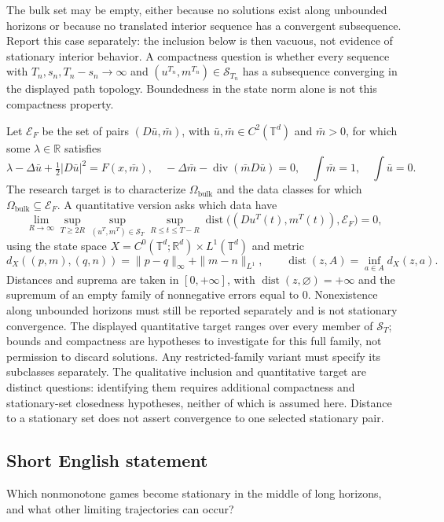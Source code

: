 \documentclass[11pt,a4paper]{article}
\begin{document}
The bulk set may be empty, either because no solutions exist along unbounded horizons or because no translated interior sequence has a convergent subsequence. Report this case separately: the inclusion below is then vacuous, not evidence of stationary interior behavior. A compactness question is whether every sequence with $T_n,s_n,T_n-s_n\to\infty$ and $(u^{T_n},m^{T_n})\in\mathcal S_{T_n}$ has a subsequence converging in the displayed path topology. Boundedness in the state norm alone is not this compactness property.

Let $\mathcal E_F$ be the set of pairs $(D\bar u,\bar m)$, with $\bar u,\bar m\in C^2(\mathbb T^d)$ and $\bar m>0$, for which some $\lambda\in\mathbb R$ satisfies
\[
 \lambda-\Delta\bar u+\tfrac12|D\bar u|^2=F(x,\bar m),\quad
 -\Delta\bar m-\operatorname{div}(\bar m D\bar u)=0,\quad
 \int\bar m=1,\quad \int\bar u=0.
\]
The research target is to characterize $\Omega_{\mathrm{bulk}}$ and the data classes for which $\Omega_{\mathrm{bulk}}\subseteq\mathcal E_F$. A quantitative version asks which data have
\[
 \lim_{R\to\infty}\sup_{T\geq2R}\sup_{(u^T,m^T)\in\mathcal S_T}
 \sup_{R\leq t\leq T-R}
 \operatorname{dist}\big((Du^T(t),m^T(t)),\mathcal E_F\big)=0,
\]
using the state space $X=C^0(\mathbb T^d;\mathbb R^d)\times L^1(\mathbb T^d)$ and metric
\[
 d_X((p,m),(q,n))=\|p-q\|_\infty+\|m-n\|_{L^1},\qquad
 \operatorname{dist}(z,A)=\inf_{a\in A}d_X(z,a).
\]
Distances and suprema are taken in $[0,+\infty]$, with $\operatorname{dist}(z,\varnothing)=+\infty$ and the supremum of an empty family of nonnegative errors equal to $0$. Nonexistence along unbounded horizons must still be reported separately and is not stationary convergence. The displayed quantitative target ranges over every member of $\mathcal S_T$; bounds and compactness are hypotheses to investigate for this full family, not permission to discard solutions. Any restricted-family variant must specify its subclasses separately. The qualitative inclusion and quantitative target are distinct questions: identifying them requires additional compactness and stationary-set closedness hypotheses, neither of which is assumed here. Distance to a stationary set does not assert convergence to one selected stationary pair.
\subsection*{Short English statement}
Which nonmonotone games become stationary in the middle of long horizons, and what other limiting trajectories can occur?
\end{document}
